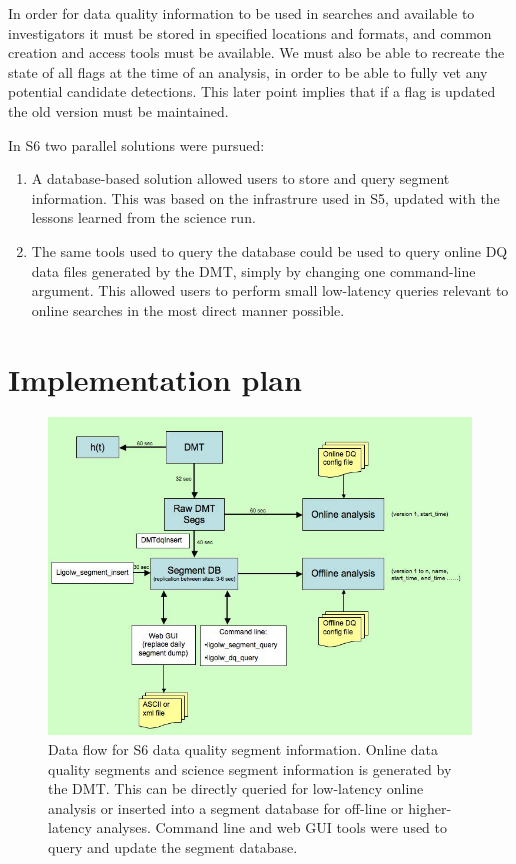 In order for data quality information to be used in searches and
available to investigators it must be stored in specified locations
and formats, and common creation and access tools must be available.
We must also be able to recreate the state of all flags at the time of
an analysis, in order to be able to fully vet any potential candidate
detections.  This later point implies that if a flag is updated the
old version must be maintained.

In S6 two parallel solutions were pursued:
\begin{enumerate}
\item A database-based solution allowed users to store and query segment
information. This was based on the infrastrure used in S5, updated with
the lessons learned from the science run.
\item The same tools used to query the database could be used 
to query online DQ data files generated by the DMT, simply by
changing one command-line argument. This allowed 
users to perform small low-latency queries relevant to online
searches in the most direct manner possible.
\end{enumerate}

\section{Implementation plan}

\begin{figure}[h]
  \begin{center}
    \includegraphics[width=0.9\linewidth]{figures/segdb/T0900005_fig1}
  \end{center}
  \caption{Data flow for S6 data quality segment information. Online data
  quality segments and science segment information is generated by the DMT.
  This can be directly queried for low-latency online analysis or inserted
  into a segment database for off-line or higher-latency analyses. Command
  line and web GUI tools were used to query and update the segment
  database.} 
\end{figure}

